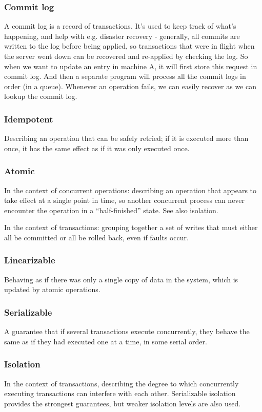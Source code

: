 \documentclass{article}
\begin{document}
    \subsubsection{Commit log}
    A commit log is a record of transactions. It's used to keep track of what's happening, and help with e.g. disaster recovery - generally, all commits are written to the log before being applied, so transactions that were in flight when the server went down can be recovered and re-applied by checking the log. So when we want to update an entry in machine A, it will first store this request in commit log. And then a separate program will process all the commit logs in order (in a queue). Whenever an operation fails, we can easily recover as we can lookup the commit log.


    \subsubsection{Idempotent}
    Describing an operation that can be safely retried; if it is executed more than once, it has the same effect as if it was only executed once.
    
    \subsubsection{Atomic}
    In the context of concurrent operations: describing an operation that appears to take effect at a single point in time, so another concurrent process can never encounter the operation in a ``half-finished” state. See also isolation.
    
    In the context of transactions: grouping together a set of writes that must either all be committed or all be rolled back, even if faults occur.
    
    \subsubsection{Linearizable}
    Behaving as if there was only a single copy of data in the system, which is updated by atomic operations.
    
    \subsubsection{Serializable}
    A guarantee that if several transactions execute concurrently, they behave the same as if they had executed one at a time, in some serial order.
    
    
    \subsubsection{Isolation}
    In the context of transactions, describing the degree to which concurrently executing transactions can interfere with each other. Serializable isolation provides the strongest guarantees, but weaker isolation levels are also used.
    
\end{document}
